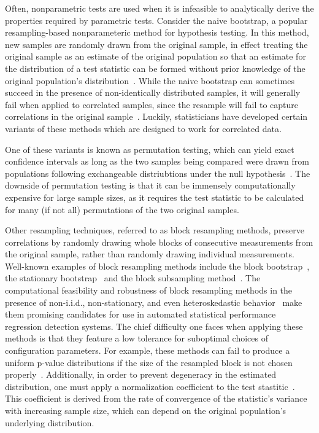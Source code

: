 \documentclass[conference]{IEEEtran}
\begin{document}
Often, nonparametric tests are used when it is infeasible to analytically derive the
properties required by parametric tests. Consider the naive bootstrap, a popular
resampling-based nonparameteric method for hypothesis testing. In this method, new samples
are randomly drawn from the original sample, in effect treating the original sample as an
estimate of the original population so that an estimate for the distribution of a test
statistic can be formed without prior knowledge of the original population's
distribution~\cite{Efron1992}. While the naive bootstrap can sometimes succeed in the
presence of non-identically distributed samples, it will generally fail when applied to
correlated samples, since the resample will fail to capture correlations in the original
sample~\cite{Mammen2012}. Luckily, statisticians have developed certain variants of these
methods which are designed to work for correlated data.

One of these variants is known as permutation testing, which can yield exact confidence
intervals as long as the two samples being compared were drawn from populations following
exchangeable distriubtions under the null hypothesis~\cite{Good2013}. The downside of
permutation testing is that it can be immensely computationally expensive for large sample
sizes, as it requires the test statistic to be calculated for many (if not all) permutations
of the two original samples.

Other resampling techniques, referred to as block resampling methods, preserve correlations
by randomly drawing whole blocks of consecutive measurements from the original sample,
rather than randomly drawing individual measurements. Well-known examples of block
resampling methods include the block bootstrap~\cite{Kunsch1989}, the stationary
bootstrap~\cite{Politis1994} and the block subsampling method~\cite{Politis1999}. The
computational feasibility and robustness of block resampling methods in the presence of
non-i.i.d., non-stationary, and even heteroskedastic behavior~\cite{Politis1999,Politis1997}
make them promising candidates for use in automated statistical performance regression
detection systems. The chief difficulty one faces when applying these methods is that they
feature a low tolerance for suboptimal choices of configuration parameters. For example,
these methods can fail to produce a uniform p-value distributions if the size of the
resampled block is not chosen properly~\cite{Shao2013}. Additionally, in order to prevent
degeneracy in the estimated distribution, one must apply a normalization coefficient to the
test stastitic~\cite{Politis1999}. This coefficient is derived from the rate of convergence
of the statistic's variance with increasing sample size, which can depend on the original
population's underlying distribution.
\end{document}
